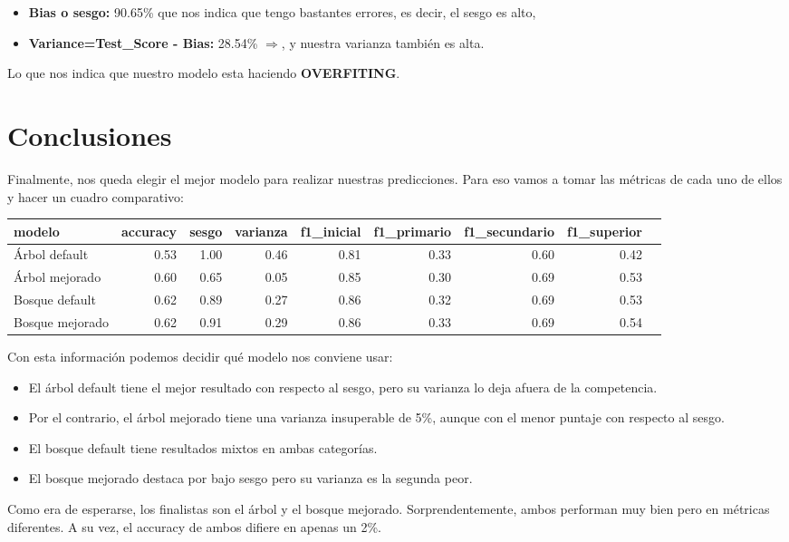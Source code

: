 \documentclass[a4paper]{article}
\begin{document}
            \begin{itemize}
                \item \textbf{Bias o sesgo:} 90.65\% que nos indica que tengo bastantes errores, es decir, el sesgo es alto,
                \item \textbf{Variance=Test\_Score - Bias:} 28.54\% $\Rightarrow$, y nuestra varianza también es alta. 
            \end{itemize} 

            Lo que nos indica que nuestro modelo esta haciendo \textbf{OVERFITING}.

\newpage

\section{Conclusiones}

    Finalmente, nos queda elegir el mejor modelo para realizar nuestras predicciones. Para eso vamos a tomar las métricas de cada uno de ellos y hacer un cuadro comparativo:
    
    \begin{table}[H]
        \centering
        \begin{tabular}{|l|r|r|r|r|r|r|r|r|}
            \hline
            modelo & accuracy & sesgo & varianza & f1\_inicial & f1\_primario & f1\_secundario & f1\_superior \\ \hline
            Árbol default & 0.53 & 1.00 & 0.46 & 0.81 & 0.33 & 0.60 & 0.42 \\ \hline
            Árbol mejorado & 0.60 & 0.65 & 0.05 & 0.85 & 0.30 & 0.69 & 0.53 \\ \hline
            Bosque default & 0.62 & 0.89 & 0.27 & 0.86 & 0.32 & 0.69 & 0.53 \\ \hline
            Bosque mejorado & 0.62 & 0.91 & 0.29 & 0.86 & 0.33 & 0.69 & 0.54 \\ \hline
        \end{tabular}
    \end{table}

    Con esta información podemos decidir qué modelo nos conviene usar:
    \begin{itemize}
        \item El árbol default tiene el mejor resultado con respecto al sesgo, pero su varianza lo deja afuera de la competencia.
        \item Por el contrario, el árbol mejorado tiene una varianza insuperable de 5\%, aunque con el menor puntaje con respecto al sesgo.
        \item El bosque default tiene resultados mixtos en ambas categorías.
        \item El bosque mejorado destaca por bajo sesgo pero su varianza es la segunda peor.
    \end{itemize}
    Como era de esperarse, los finalistas son el árbol y el bosque mejorado. Sorprendentemente, ambos performan muy bien pero en métricas diferentes. A su vez, el accuracy de ambos difiere en apenas un 2\%.
\end{document}
